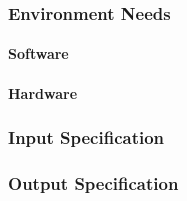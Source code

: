 \subsubsection{Environment Needs}

\paragraph{Software}

\paragraph{Hardware}

\subsubsection{Input Specification}

\subsubsection{Output Specification}

